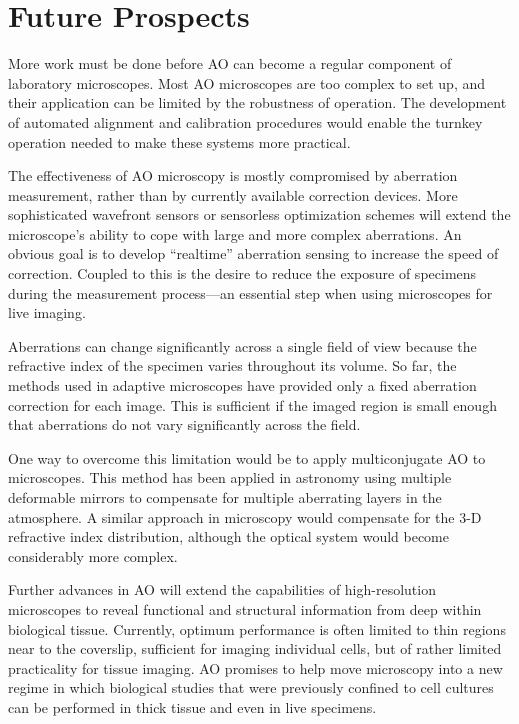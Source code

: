 \section{Future Prospects}
\label{sec:Future}

More work must be done before AO can become a regular component of laboratory 
microscopes. Most AO microscopes are too complex to set up, and their 
application can be limited by the robustness of operation. The development of 
automated alignment and calibration procedures would enable the turnkey 
operation needed to make these systems more practical.

The effectiveness of AO microscopy is mostly compromised by aberration 
measurement, rather than by currently available correction devices. More 
sophisticated wavefront sensors or sensorless optimization schemes will 
extend the microscope’s ability to cope with large and more complex 
aberrations. An obvious goal is to develop “realtime” aberration sensing to 
increase the speed of correction. Coupled to this is the desire to reduce the 
exposure of specimens during the measurement process—an essential step when 
using microscopes for live imaging.

Aberrations can change significantly across a single field of view because 
the refractive index of the specimen varies throughout its volume. So far, 
the methods used in adaptive microscopes have provided only a fixed 
aberration correction for each image. This is sufficient if the imaged region 
is small enough that aberrations do not vary significantly across the field.

One way to overcome this limitation would be to apply multiconjugate AO to 
microscopes. This method has been applied in astronomy using multiple 
deformable mirrors to compensate for multiple aberrating layers in the 
atmosphere. A similar approach in microscopy would compensate for the 3-D 
refractive index distribution, although the optical system would become 
considerably more complex.

Further advances in AO will extend the capabilities of high-resolution 
microscopes to reveal functional and structural information from deep within 
biological tissue. Currently, optimum performance is often limited to thin 
regions near to the coverslip, sufficient for imaging individual cells, but 
of rather limited practicality for tissue imaging. AO promises to help move 
microscopy into a new regime in which biological studies that were previously 
confined to cell cultures can be performed in thick tissue and even in live 
specimens.

